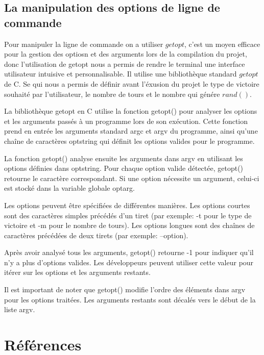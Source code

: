 \documentclass[a4paper]{article}
\begin{document}
\subsection{La manipulation des options de ligne de commande}


Pour manipuler la ligne de commande on a utiliser $getopt$, c'est un moyen efficace pour la gestion des optiosn et des arguments lors de la compilation du projet, donc l'utilisation de getopt nous a permis de rendre le terminal une interface utilisateur intuisive et personnalisable. Il utilise une bibliothèque standard $getopt$ de C. Se qui nous a permis de définir avant l'éxusion du projet le type de victoire souhaité par l'utilisateur, le nombre de tours et le nombre qui génére $rand()$. 

La bibliothèque getopt en C utilise la fonction getopt() pour analyser les options et les arguments passés à un programme lors de son exécution. Cette fonction prend en entrée les arguments standard argc et argv du programme, ainsi qu'une chaîne de caractères optstring qui définit les options valides pour le programme.

La fonction getopt() analyse ensuite les arguments dans argv en utilisant les options définies dans optstring. Pour chaque option valide détectée, getopt() retourne le caractère correspondant. Si une option nécessite un argument, celui-ci est stocké dans la variable globale optarg.

Les options peuvent être spécifiées de différentes manières. Les options courtes sont des caractères simples précédés d'un tiret (par exemple: -t pour le type de victoire et -m pour le nombre de tours). Les options longues sont des chaînes de caractères précédées de deux tirets (par exemple: --option).

Après avoir analysé tous les arguments, getopt() retourne -1 pour indiquer qu'il n'y a plus d'options valides. Les développeurs peuvent utiliser cette valeur pour itérer sur les options et les arguments restants.

Il est important de noter que getopt() modifie l'ordre des éléments dans argv pour les options traitées. Les arguments restants sont décalés vers le début de la liste argv.

\section{Références}
\end{document}

